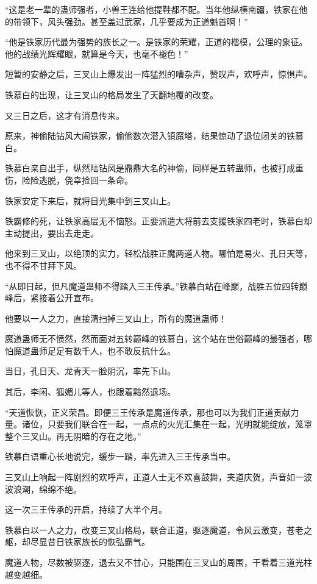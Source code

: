 \begin{this_body}
“这是老一辈的蛊师强者，小兽王连给他提鞋都不配。当年他纵横南疆，铁家在他的带领下，风头强劲。甚至盖过武家，几乎要成为正道魁首啊！”

“他是铁家历代最为强势的族长之一。是铁家的荣耀，正道的楷模，公理的象征。他的战绩光辉耀眼，就算是今天，也毫不褪色！”

短暂的安静之后，三叉山上爆发出一阵猛烈的嘈杂声，赞叹声，欢呼声，惊惧声。

铁慕白的出现，让三叉山的格局发生了天翻地覆的改变。

又三日之后，这才有消息传来。

原来，神偷陆钻风大闹铁家，偷偷数次潜入镇魔塔，结果惊动了退位闭关的铁慕白。

铁慕白亲自出手，纵然陆钻风是鼎鼎大名的神偷，同样是五转蛊师，也被打成重伤，险险逃脱，侥幸捡回一条命。

铁家安定下来后，就将目光集中到三叉山上。

铁霸修的死，让铁家高层无不恼怒。正要派遣大将前去支援铁家四老时，铁慕白却主动提出，要出去走走。

他来到三叉山，以绝顶的实力，轻松战胜正魔两道人物。哪怕是易火、孔日天等，也不得不甘拜下风。

“从即日起，但凡魔道蛊师不得踏入三王传承。”铁慕白站在峰巅，战胜五位四转巅峰后，紧接着公开宣布。

他要以一人之力，直接清扫掉三叉山上，所有的魔道蛊师！

魔道蛊师无不愤然，然而面对五转巅峰的铁慕白，这个站在世俗巅峰的最强者，哪怕魔道蛊师足足有数千人，也不敢反抗什么。

当日，孔日天、龙青天一脸阴沉，率先下山。

其后，李闲、狐媚儿等人，也跟着黯然退场。

“天道恢恢，正义荣昌。即便三王传承是魔道传承，那也可以为我们正道贡献力量。诸位，只要我们联合在一起，一点点的火光汇集在一起，光明就能绽放，笼罩整个三叉山。再无阴暗的存在之地。”

铁慕白语重心长地说完，缓步一踏，率先进入三王传承当中。

三叉山上响起一阵剧烈的欢呼声，正道人士无不欢喜鼓舞，夹道庆贺，声音如一波波浪潮，绵绵不绝。

这一次三王传承的开启，持续了大半个月。

铁慕白以一人之力，改变三叉山格局，联合正道，驱逐魔道，令风云激变，苍老之躯，却尽显昔日铁家族长的恢弘霸气。

魔道人物，尽数被驱逐，退去又不甘心，只能围在三叉山的周围，干看着三道光柱越变越细。


\end{this_body}
